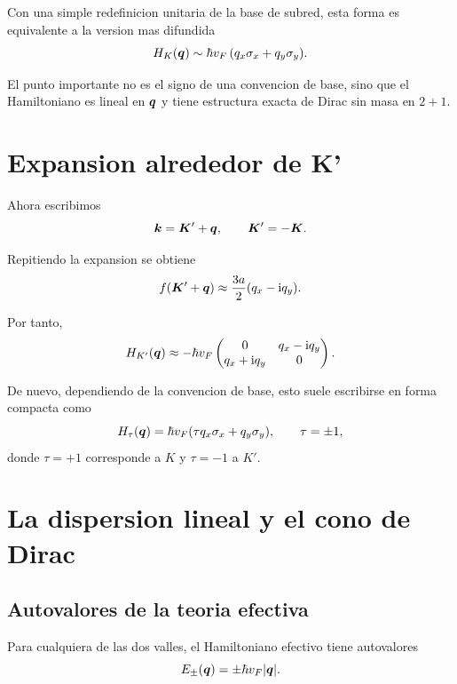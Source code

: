 Con una simple redefinicion unitaria de la base de subred, esta forma es equivalente a la version mas difundida
\begin{equation}
H_K(\bm{q})\sim \hbar v_F\,(q_x \sigma_x + q_y \sigma_y).
\label{c02:eq:HK-standard}
\end{equation}

El punto importante no es el signo de una convencion de base, sino que el Hamiltoniano es lineal en \(\bm{q}\) y tiene estructura exacta de Dirac sin masa en \(2+1\).

\section{Expansion alrededor de K'}

Ahora escribimos
\begin{equation}
\bm{k}=\bm{K}'+\bm{q},
\qquad
\bm{K}'=-\bm{K}.
\end{equation}

Repitiendo la expansion se obtiene
\begin{equation}
f(\bm{K}'+\bm{q})\approx \frac{3a}{2}(q_x-\mathrm{i} q_y).
\label{c02:eq:fKp-final}
\end{equation}

Por tanto,
\begin{equation}
H_{K'}(\bm{q})
\approx
-\hbar v_F
\begin{pmatrix}
0 & q_x-\mathrm{i} q_y\\
q_x+\mathrm{i} q_y & 0
\end{pmatrix}.
\label{c02:eq:HKp-matrix}
\end{equation}

De nuevo, dependiendo de la convencion de base, esto suele escribirse en forma compacta como
\begin{equation}
H_\tau(\bm{q})=\hbar v_F(\tau q_x \sigma_x + q_y \sigma_y),
\qquad \tau=\pm 1,
\label{c02:eq:valley-compact}
\end{equation}
donde \(\tau=+1\) corresponde a \(K\) y \(\tau=-1\) a \(K'\).

\section{La dispersion lineal y el cono de Dirac}

\subsection{Autovalores de la teoria efectiva}

Para cualquiera de las dos valles, el Hamiltoniano efectivo tiene autovalores
\begin{equation}
E_\pm(\bm{q})=\pm \hbar v_F |\bm{q}|.
\label{c02:eq:dirac-dispersion}
\end{equation}

